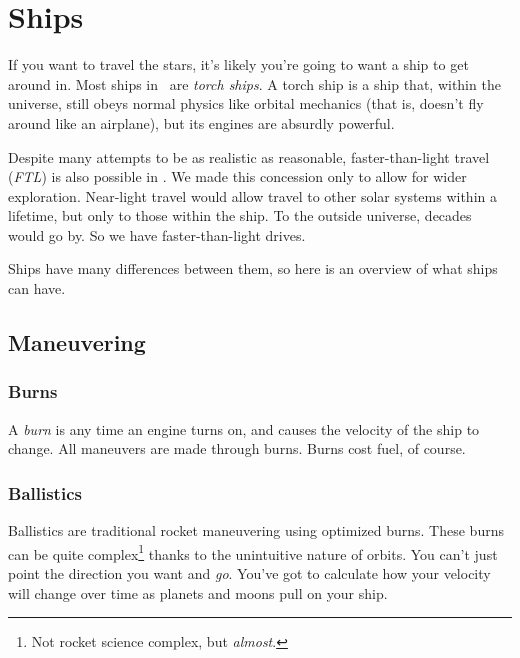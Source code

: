 



\section{Ships}

\par
If you want to travel the stars, it's likely you're going to want a ship to get around in. Most ships in \getTitle\, are \textit{torch ships}. A torch ship is a ship that, within the universe, still obeys normal physics like orbital mechanics (that is, doesn't fly around like an airplane), but its engines are absurdly powerful.

\par
Despite many attempts to be as realistic as reasonable, faster-than-light travel (\textit{FTL}) is also possible in \getTitle . We made this concession only to allow for wider exploration. Near-light travel would allow travel to other solar systems within a lifetime, but only to those within the ship. To the outside universe, decades would go by. So we have faster-than-light drives.

\par
Ships have many differences between them, so here is an overview of what ships can have.

\subsection{Maneuvering}

\subsubsection{Burns}
\par
A \textit{burn} is any time an engine turns on, and causes the velocity of the ship to change. All maneuvers are made through burns. Burns cost fuel, of course.

\subsubsection{Ballistics}
\par
Ballistics are traditional rocket maneuvering using optimized burns. These burns can be quite complex\footnote{Not rocket science complex, but \textit{almost}.} thanks to the unintuitive nature of orbits. You can't just point the direction you want and \textit{go}. You've got to calculate how your velocity will change over time as planets and moons pull on your ship.

